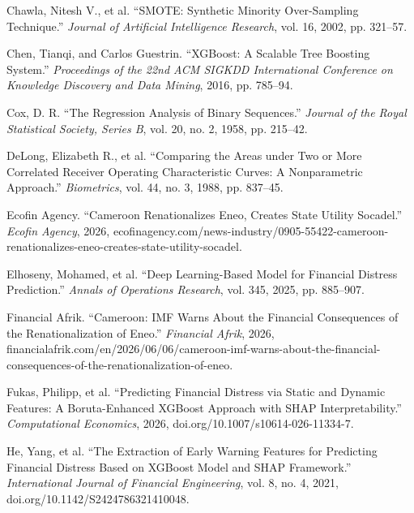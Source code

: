 \documentclass[final,1p,times]{elsarticle}
\begin{document}
\begin{list}{}{\setlength{\leftmargin}{0.5in}\setlength{\itemindent}{-0.5in}\setlength{\itemsep}{10pt}\setlength{\parsep}{0pt}}
\item Chawla, Nitesh V., et al. ``SMOTE: Synthetic Minority Over-Sampling Technique.'' \textit{Journal of Artificial Intelligence Research}, vol. 16, 2002, pp. 321--57.

\item Chen, Tianqi, and Carlos Guestrin. ``XGBoost: A Scalable Tree Boosting System.'' \textit{Proceedings of the 22nd ACM SIGKDD International Conference on Knowledge Discovery and Data Mining}, 2016, pp. 785--94.

\item Cox, D. R. ``The Regression Analysis of Binary Sequences.'' \textit{Journal of the Royal Statistical Society, Series B}, vol. 20, no. 2, 1958, pp. 215--42.

\item DeLong, Elizabeth R., et al. ``Comparing the Areas under Two or More Correlated Receiver Operating Characteristic Curves: A Nonparametric Approach.'' \textit{Biometrics}, vol. 44, no. 3, 1988, pp. 837--45.

\item Ecofin Agency. ``Cameroon Renationalizes Eneo, Creates State Utility Socadel.'' \textit{Ecofin Agency}, 2026, ecofinagency.com/news-industry/0905-55422-cameroon-renationalizes-eneo-creates-state-utility-socadel.

\item Elhoseny, Mohamed, et al. ``Deep Learning-Based Model for Financial Distress Prediction.'' \textit{Annals of Operations Research}, vol. 345, 2025, pp. 885--907.

\item Financial Afrik. ``Cameroon: IMF Warns About the Financial Consequences of the Renationalization of Eneo.'' \textit{Financial Afrik}, 2026, financialafrik.com/en/2026/06/06/cameroon-imf-warns-about-the-financial-consequences-of-the-renationalization-of-eneo.

\item Fukas, Philipp, et al. ``Predicting Financial Distress via Static and Dynamic Features: A Boruta-Enhanced XGBoost Approach with SHAP Interpretability.'' \textit{Computational Economics}, 2026, doi.org/10.1007/s10614-026-11334-7.

\item He, Yang, et al. ``The Extraction of Early Warning Features for Predicting Financial Distress Based on XGBoost Model and SHAP Framework.'' \textit{International Journal of Financial Engineering}, vol. 8, no. 4, 2021, doi.org/10.1142/S2424786321410048.


\end{list}
\end{document}
